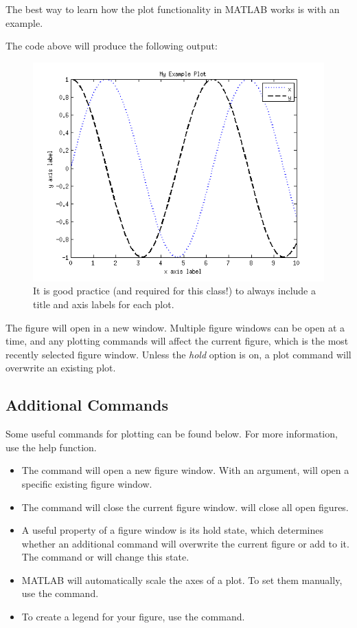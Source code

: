 \documentclass[paper=a4, fontsize=11pt]{scrartcl} %
\numberwithin{equation}{section} %
\numberwithin{figure}{section} %
\numberwithin{table}{section} %
\begin{document}
The best way to learn how the plot functionality in MATLAB works is with an example.
\newpage

The code above will produce the following output: 
\begin{figure}[h!]
\centering
\includegraphics[scale=.75]{plot_example}
\caption{It is good practice (and required for this class!) to always include a title and axis labels for each plot.}
\end{figure}
The figure will open in a new window. Multiple figure windows can be open at a time, and any plotting commands will affect the current figure, which is the most recently selected figure window. Unless the \textit{hold} option is on, a plot command will overwrite an existing plot.
\subsection{Additional Commands}
Some useful commands for plotting can be found below. For more information, use the help function.
\begin{itemize}
\item The  command will open a new figure window. With an argument,  will open a specific existing figure window.
\item The command  will close the current figure window.
 will close all open figures.
\item A useful property of a figure window is its hold state, which determines whether an additional  command will overwrite the current figure or add to it. 
The command  or  will change this state. 
\item MATLAB will automatically scale the axes of a plot. To set them manually, use the \mcode{axis({xmin xmax ymin ymax]}} command.
\item To create a legend for your figure, use the  command.

\end{itemize}
\end{document}
